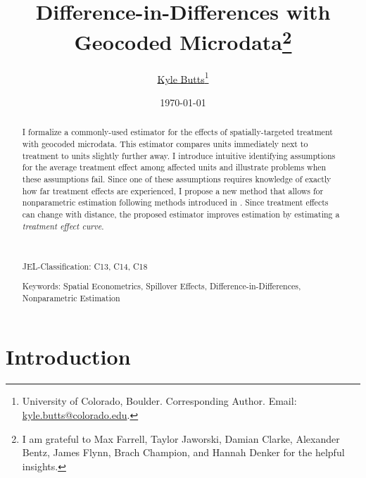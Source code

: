 \documentclass[12pt]{article}
\title{Difference-in-Differences with Geocoded Microdata\thanks{I am grateful to Max Farrell, Taylor Jaworski, Damian Clarke, Alexander Bentz, James Flynn, Brach Champion, and Hannah Denker for the helpful insights.}}
\author{\href{https://kylebutts.com/}{Kyle Butts}\thanks{University of Colorado, Boulder. Corresponding Author. Email: \href{mailto:kyle.butts@colorado.edu}{kyle.butts@colorado.edu}.} %
}
\date{\today}
\begin{document}
\begin{titlepage}
\maketitle

\begin{abstract}
    I formalize a commonly-used estimator for the effects of spatially-targeted treatment with geocoded microdata. This estimator compares units immediately next to treatment to units slightly further away. I introduce intuitive identifying assumptions for the average treatment effect among affected units and illustrate problems when these assumptions fail. Since one of these assumptions requires knowledge of exactly how far treatment effects are experienced, I propose a new method that allows for nonparametric estimation following methods introduced in \citet{Cattaneo_Farrell_Feng_2019}. Since treatment effects can change with distance, the proposed estimator improves estimation by estimating a \emph{treatment effect curve}.

    \par~\par\noindent
    {\color{asher}JEL-Classification:} C13, C14, C18
    \par\noindent
    {\color{asher}Keywords:} Spatial Econometrics, Spillover Effects, Difference-in-Differences, Nonparametric Estimation
    \par\vspace{-2.5mm}
\end{abstract}
\end{titlepage}


\section{Introduction}
\end{document}
